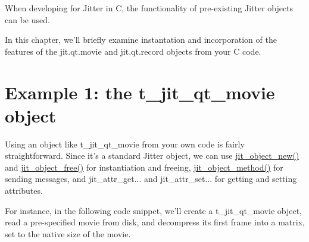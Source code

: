 When developing for Jitter in C, the functionality of pre-\/existing Jitter objects can be used.

In this chapter, we'll briefly examine instantation and incorporation of the features of the jit.qt.movie and jit.qt.record objects from your C code.\hypertarget{chapter_jit_usingobjs_chapter_jit_usingobjs_ex1}{}\section{Example 1: the t\_\-jit\_\-qt\_\-movie object}\label{chapter_jit_usingobjs_chapter_jit_usingobjs_ex1}
Using an object like t\_\-jit\_\-qt\_\-movie from your own code is fairly straightforward. Since it's a standard Jitter object, we can use \hyperlink{group__objectmod_gabde2eb49750992ec4125af862b402342}{jit\_\-object\_\-new()} and \hyperlink{group__objectmod_ga64970b62e5afe7a2cbd57efd6e9e9f74}{jit\_\-object\_\-free()} for instantiation and freeing, \hyperlink{group__objectmod_ga9e1b9b8ed4fce611de26a74c6e1452c8}{jit\_\-object\_\-method()} for sending messages, and jit\_\-attr\_\-get... and jit\_\-attr\_\-set... for getting and setting attributes.

For instance, in the following code snippet, we'll create a t\_\-jit\_\-qt\_\-movie object, read a pre-\/specified movie from disk, and decompress its first frame into a matrix, set to the native size of the movie.


